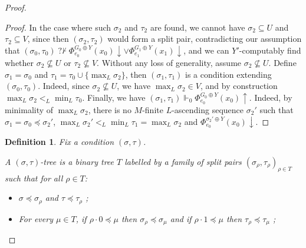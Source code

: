 \documentclass{article}
\numberwithin{theorem}{section}
\newtheorem{definition}[theorem]{Definition}
\newcommand{\nqvdash}{\operatorname{{?}{\nvdash}}}
\newcommand{\uh}[0]{{\upharpoonright}}
\begin{document}
\begin{proof}
\begin{proof}
In the case where such $\sigma_2$ and $\tau_2$ are found, we cannot have $\sigma_2 \subseteq U$ and $\tau_2 \subseteq V$, since then $(\sigma_2, \tau_2)$ would form a split pair, contradicting our assumption that $(\sigma_0, \tau_0) \nqvdash \Phi_{e_0}^{G_0 \oplus Y}(x_0) \downarrow \vee \Phi_{e_1}^{G_1 \oplus Y}(x_1) \downarrow$, and we can $Y'$-computably find whether $\sigma_2 \not \subseteq U$ or $\tau_2 \not \subseteq V$. Without any loss of generality, assume $\sigma_2 \not \subseteq U$. Define $\sigma_1 = \sigma_0$ and $\tau_1 = \tau_0 \cup \{\max_L \sigma_2\}$, then $(\sigma_1, \tau_1)$ is a condition extending $(\sigma_0, \tau_0)$. Indeed, since $\sigma_2 \not \subseteq U$, we have $\max_L \sigma_2 \in V$, and by construction $\max_L \sigma_2 <_L \min_L \tau_0$. Finally, we have $(\sigma_1, \tau_1) \Vdash_0 \Phi_{e_0}^{G_0 \oplus Y}(x_0) \uparrow$. Indeed, by minimality of $\max_L \sigma_2$, there is no $M$-finite $L$-ascending sequence $\sigma_2'$ such that $\sigma_1 = \sigma_0 \preceq \sigma_2'$, $\max_L \sigma_2' <_L \min_L \tau_1 = \max_L \sigma_2$ and $\Phi_{e_0}^{\sigma_2' \oplus Y}(x_0) \downarrow$.
\end{proof}


\begin{definition}
Fix a condition $(\sigma, \tau)$.

A \emph{$(\sigma, \tau)$-tree} is a binary tree $T$ labelled by a family of split pairs $(\sigma_{\rho}, \tau_{\rho})_{\rho \in T}$ such that for all $\rho \in T$:
\begin{itemize}
    \item $\sigma \preceq \sigma_{\rho}$ and $\tau \preceq \tau_{\rho}$ ;
    \item For every $\mu \in T$, if $\rho \cdot 0 \preceq \mu$ then $\sigma_{\rho} \preceq \sigma_{\mu}$ and if $\rho \cdot 1 \preceq \mu$ then $\tau_{\rho} \preceq \tau_{\mu}$ ;
\end{itemize}



\end{definition}
\end{proof}
\end{document}
